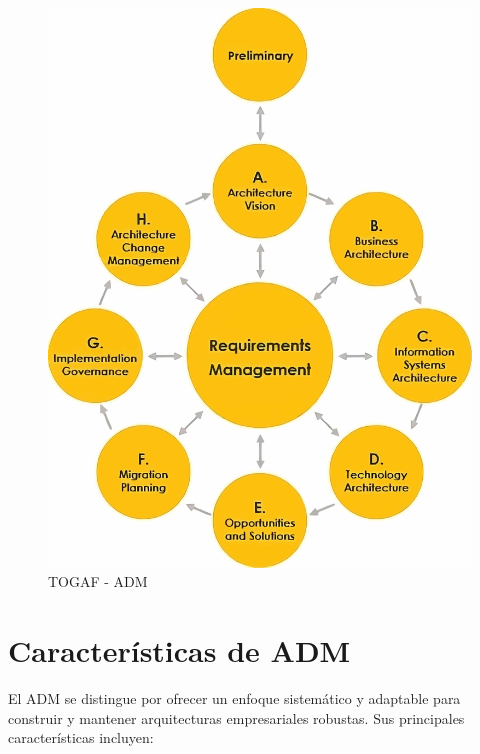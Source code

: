 \begin{figure}[H]
	\centering
	\includegraphics[width=0.7\linewidth]{imgs/Capas ADM.pdf}
	\caption{TOGAF - ADM \cite{capas_ADM}}
	\label{capas-ADM}
\end{figure}

\section{Características de ADM}
El ADM se distingue por ofrecer un enfoque sistemático y adaptable para construir y mantener arquitecturas empresariales robustas. Sus principales características incluyen:

